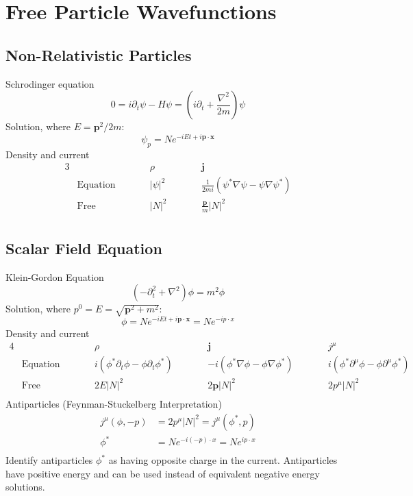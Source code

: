 \documentclass[12pt]{article}
\theoremstyle{definition}
\begin{document}
\section{Free Particle Wavefunctions}

\subsection{Non-Relativistic Particles}
Schrodinger equation
\begin{equation*}
    0 = i \partial_t \psi - H \psi = \left( i \partial_t + \frac{\nabla^2}{2m} \right) \psi
\end{equation*}
Solution, where $E = \bm{p}^2 / 2m$:
\begin{equation*}
    \psi_p = N e^{-iEt + i \bm{p} \cdot \bm{x}}
\end{equation*}
Density and current
\begin{alignat*}{3}
    & \qquad && \rho && \bm{j} \\
    & \text{Equation} \qquad && |\psi|^2 \qquad && \frac{1}{2mi} \left( \psi^* \nabla \psi - \psi \nabla \psi^* \right) \\
    & \text{Free} \qquad && |N|^2 \qquad && \frac{\bm{p}}{m} |N|^2 \\
\end{alignat*}

\subsection{Scalar Field Equation}
Klein-Gordon Equation
\begin{equation*}
    (-\partial_t^2 + \nabla^2) \phi = m^2 \phi
\end{equation*}
Solution, where $p^0 = E = \sqrt{\bm{p}^2 + m^2}$:
\begin{equation*}
    \phi = N e^{-iEt + i\bm{p} \cdot \bm{x}} = N e^{- i p \cdot x}
\end{equation*}
Density and current
\begin{alignat*}{4}
    & \qquad && \rho && \bm{j} && j^\mu \\
    & \text{Equation} \qquad && i \left( \phi^* \partial_t \phi - \phi \partial_t \phi^* \right) \qquad && -i\left( \phi^* \nabla \phi - \phi \nabla \phi^* \right) \qquad && i\left( \phi^* \partial^\mu \phi - \phi \partial^\mu \phi^* \right) \\
    & \text{Free} \qquad && 2E|N|^2 && 2\bm{p}|N|^2 \qquad && 2p^\mu |N|^2 \\
\end{alignat*}
Antiparticles (Feynman-Stuckelberg Interpretation)
\begin{equation*}
\begin{split}
    j^\mu(\phi,-p) &= 2p^\mu |N|^2 = j^\mu(\phi^*,p) \\
    \phi^* &= N e^{-i (-p) \cdot x} = N e^{i p \cdot x} \\
\end{split}
\end{equation*}
Identify antiparticles $\phi^*$ as having opposite charge in the current. Antiparticles have positive energy
and can be used instead of equivalent negative energy solutions.
\end{document}
